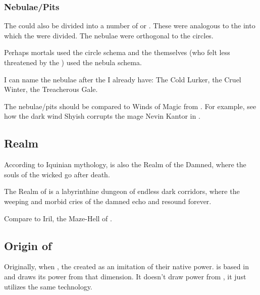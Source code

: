 \subsubsection{Nebulae/Pits}
The \qliphoth could also be divided into a number of  or . 
These were analogous to the  into which the \sephiroth were divided. 
The nebulae were orthogonal to the circles. 

Perhaps mortals used the circle schema and the \resphain themselves (who felt less threatened by the \qliphoth) used the nebula schema.

I can name the nebulae after the \qliphoth I already have: 
The Cold Lurker, the Cruel Winter, the Treacherous Gale. 

The nebulae/pits should be compared to Winds of Magic from \cite{RPG:Warhammer}. 
For example, see how the dark wind Shyish corrupts the mage Nevin Kantor in \cite{StevenSavile:Dominion}.









\subsection{Realm}
According to Iquinian mythology, \Itzach{} is also the Realm of the Damned, where the souls of the wicked go after death. 

The Realm of \Itzach{} is a labyrinthine dungeon of endless dark corridors, where the weeping and morbid cries of the damned echo and resound forever. 

Compare to Iril, the Maze-Hell of . 








\subsection{Origin of \Itzach}
Originally, when ,
the \banes{} created \itzach{} as an imitation of their native \erebean{} power. \Nieur{} is based in \Nyx{} and draws its power from that dimension. It doesn't draw power from \Erebos, it just utilizes the same technology. 

